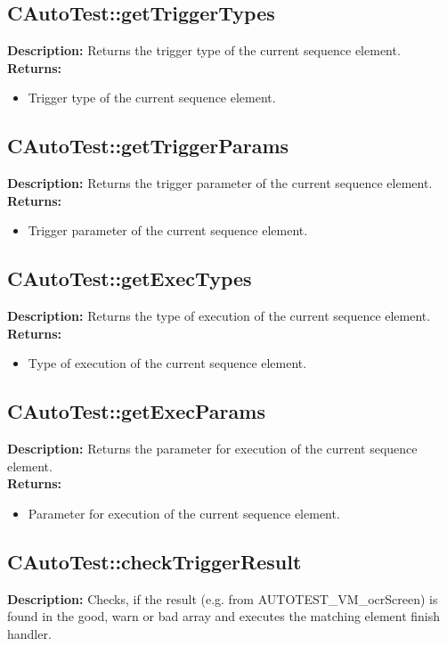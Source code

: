 \subsection{CAutoTest::getTriggerTypes}
\textbf{Description:} Returns the trigger type of the current sequence element.\\
\textbf{Returns:}
\begin{itemize}
\item Trigger type of the current sequence element.
\end{itemize}

\subsection{CAutoTest::getTriggerParams}
\textbf{Description:} Returns the trigger parameter of the current sequence element.\\
\textbf{Returns:}
\begin{itemize}
\item Trigger parameter of the current sequence element.
\end{itemize}

\subsection{CAutoTest::getExecTypes}
\textbf{Description:} Returns the type of execution of the current sequence element.\\
\textbf{Returns:}
\begin{itemize}
\item Type of execution of the current sequence element.
\end{itemize}

\subsection{CAutoTest::getExecParams}
\textbf{Description:} Returns the parameter for execution of the current sequence element.\\
\textbf{Returns:}
\begin{itemize}
\item Parameter for execution of the current sequence element.
\end{itemize}

\subsection{CAutoTest::checkTriggerResult}
\textbf{Description:} Checks, if the result (e.g. from AUTOTEST\_VM\_ocrScreen) is found in the good, warn or bad array and executes the matching element finish handler.\\

